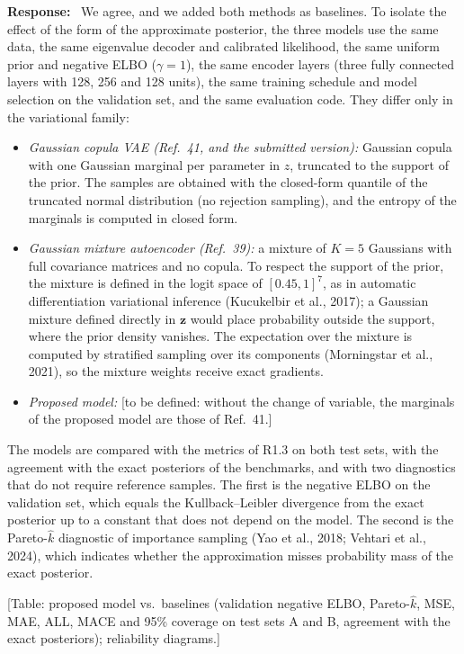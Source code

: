 \documentclass[11pt]{article}
\newenvironment{response}{\par\smallskip\noindent\color{resp}\textbf{Response:}\ }{\par}
\newcommand{\tbd}[1]{\textcolor{note}{\textsf{[#1]}}}
\newcommand{\z}{\mathbf{z}}
\begin{document}
\begin{response}
We agree, and we added both methods as baselines. To isolate the effect of the form of the approximate posterior, the
three models use the same data, the same eigenvalue decoder and calibrated likelihood, the same uniform prior and
negative ELBO ($\gamma=1$), the same encoder layers (three fully connected layers with 128, 256 and 128 units), the same
training schedule and model selection on the validation set, and the same evaluation code. They differ only in the
variational family:
\begin{itemize}[leftmargin=*]
\item \emph{Gaussian copula VAE (Ref.~41, and the submitted version):} Gaussian copula with one Gaussian marginal per
parameter in $z$, truncated to the support of the prior. The samples are obtained with the closed-form quantile of the
truncated normal distribution (no rejection sampling), and the entropy of the marginals is computed in closed form.
\item \emph{Gaussian mixture autoencoder (Ref.~39):} a mixture of $K=5$ Gaussians with full covariance matrices and no
copula. To respect the support of the prior, the mixture is defined in the logit space of $[0.45,1]^7$, as in automatic
differentiation variational inference (Kucukelbir et al., 2017); a Gaussian mixture defined directly in $\z$ would place
probability outside the support, where the prior density vanishes. The expectation over the mixture is computed by
stratified sampling over its components (Morningstar et al., 2021), so the mixture weights receive exact gradients.
\item \emph{Proposed model:} \tbd{to be defined: without the change of variable, the marginals of the proposed model are those of Ref.~41.}
\end{itemize}
The models are compared with the metrics of R1.3 on both test sets, with the agreement with the exact posteriors of the
benchmarks, and with two diagnostics that do not require reference samples. The first is the negative ELBO on the
validation set, which equals the Kullback--Leibler divergence from the exact posterior up to a constant that does not
depend on the model. The second is the Pareto-$\hat{k}$ diagnostic of importance sampling (Yao et al., 2018; Vehtari
et al., 2024), which indicates whether the approximation misses probability mass of the exact posterior.

\tbd{Table: proposed model vs.\ baselines (validation negative ELBO, Pareto-$\hat{k}$, MSE, MAE, ALL, MACE and 95\%
coverage on test sets A and B, agreement with the exact posteriors); reliability diagrams.}
\end{response}
\end{document}
